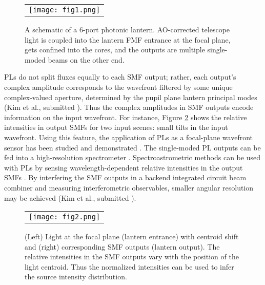 \documentclass[]{AO4ELT}  %
\begin{document}
\begin{figure} [ht]
\begin{center}
\begin{tabular}{c} 
\texttt{[image: fig1.png]}
\end{tabular}
\end{center}
\caption[example] 
{ \label{fig:PL} 
A schematic of a 6-port photonic lantern. AO-corrected telescope light is coupled into the lantern FMF entrance at the focal plane, gets confined into the cores, and the outputs are multiple single-moded beams on the other end.}
\end{figure} 

PLs do not split fluxes equally to each SMF output; rather, each output's complex amplitude corresponds to the wavefront filtered by some unique complex-valued aperture, determined by the pupil plane lantern principal modes (Kim et al., submitted \cite{kim23}). Thus the complex amplitudes in SMF outputs encode information on the input wavefront.
For instance, Figure \ref{fig:demo} shows the relative intensities in output SMFs for two input scenes: small tilts in the input wavefront. 
Using this feature, the application of PLs as a focal-plane wavefront sensor has been studied and demonstrated \cite{lin22a, nor20}. The single-moded PL outputs can be fed into a high-resolution spectrometer \cite{jov16, lin21b}. Spectroastrometric methods can be used with PLs by sensing wavelength-dependent relative intensities in the output SMFs \cite{kim22, lev23}. By interfering the SMF outputs in a backend integrated circuit beam combiner and measuring interferometric observables, smaller angular resolution may be achieved (Kim et al., submitted \cite{kim23}). 

\begin{figure} [ht]
\begin{center}
\begin{tabular}{c} 
\texttt{[image: fig2.png]}
\end{tabular}
\end{center}
\caption[example] 
{ \label{fig:demo} 
(Left) Light at the focal plane (lantern entrance) with centroid shift and (right) corresponding SMF outputs (lantern output). The relative intensities in the SMF outputs vary with the position of the light centroid. Thus the normalized intensities can be used to infer the source intensity distribution.}
\end{figure} 
\end{document}

